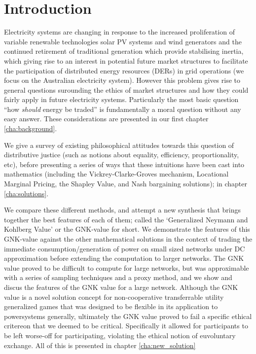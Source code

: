 \chapter{Introduction}
\label{cha:intro}


Electricity systems are changing in response to the increased proliferation of variable renewable technologies solar PV systems and wind generators and the continued retirement of traditional generation which provide stabilising inertia, which giving rise to an interest in potential future market structures to facilitate the participation of distributed energy resources (DERs) in grid operations (we focus on the Australian electricity system).
However this problem gives rise to general questions surounding the ethics of market structures and how they could fairly apply in future electricity systems. Particularly the most basic question ``how \textit{should} energy be traded'' is fundamentally a moral question without any easy answer. These considerations are presented in our first chapter \ref{cha:background}.

We give a survey of existing philosophical attitudes towards this question of distributive justice (such as notions about equality, efficiency, proportionality, etc), before presenting a series of ways that these intuitions have been cast into mathematics (including the Vickrey-Clarke-Groves mechanism, Locational Marginal Pricing, the Shapley Value, and Nash bargaining solutions); in chapter \ref{cha:solutions}.

We compare these different methods, and attempt a new synthesis that brings together the best features of each of them; called the `Generalized Neymann and Kohlberg Value' or the GNK-value for short.
We demonstrate the features of this GNK-value against the other mathematical solutions in the context of trading the immediate consumption/generation of power on small sized networks under DC approximation before extending the computation to larger networks.
The GNK value proved to be difficult to compute for large networks, but was approximable with a series of sampling techniques and a proxy method, and we show and discus the features of the GNK value for a large network.
Although the GNK value is a novel solution concept for non-cooperative transferrable utility generalized games that was designed to be flexible in its application to powersystems generally, ultimately the GNK value proved to fail a specific ethical critereon that we deemed to be critical.
Specifically it allowed for participants to be left worse-off for participating, violating the ethical notion of euvoluntary exchange.
All of this is presented in chapter \ref{cha:new_solution}

